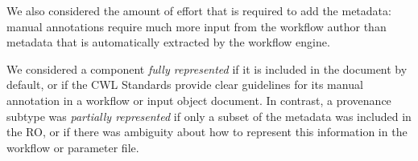 We also considered the amount of effort that is required to add the metadata: manual annotations require much more input from the workflow author than metadata that is automatically extracted by the workflow engine.

We considered a component \emph{fully represented} if it is included in the document by default, or if the CWL Standards provide clear guidelines for its manual annotation in a workflow or input object document. In contrast, a provenance subtype was \emph{partially represented} if only a subset of the metadata was included in the RO, or if there was ambiguity about how to represent this information in the workflow or parameter file. 




